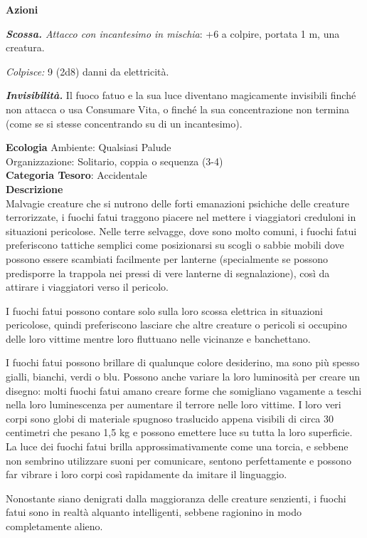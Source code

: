 \begin{multicols}{2}
{\textbf{Azioni}

\emph{\textbf{Scossa.} Attacco con incantesimo in mischia}: +6 a colpire, portata 1 m, una creatura.

\emph{Colpisce:} 9 (2d8) danni da elettricità.

\emph{\textbf{Invisibilità.}} Il fuoco fatuo e la sua luce diventano magicamente invisibili finché non attacca o usa Consumare Vita, o finché la sua concentrazione non termina (come se si stesse concentrando su di un incantesimo).

\textbf{Ecologia}
Ambiente: Qualsiasi Palude\\
Organizzazione: Solitario, coppia o sequenza (3-4)\\
\textbf{Categoria Tesoro}: Accidentale\\
\textbf{Descrizione}\\
Malvagie creature che si nutrono delle forti emanazioni psichiche delle creature terrorizzate, i fuochi fatui traggono piacere nel mettere i viaggiatori creduloni in situazioni pericolose. Nelle terre selvagge, dove sono molto comuni, i fuochi fatui preferiscono tattiche semplici come posizionarsi su scogli o sabbie mobili dove possono essere scambiati facilmente per lanterne (specialmente se possono predisporre la trappola nei pressi di vere lanterne di segnalazione), così da attirare i viaggiatori verso il pericolo.

I fuochi fatui possono contare solo sulla loro scossa elettrica in situazioni pericolose, quindi preferiscono lasciare che altre creature o pericoli si occupino delle loro vittime mentre loro fluttuano nelle vicinanze e banchettano.

I fuochi fatui possono brillare di qualunque colore desiderino, ma sono più spesso gialli, bianchi, verdi o blu. Possono anche variare la loro luminosità per creare un disegno: molti fuochi fatui amano creare forme che somigliano vagamente a teschi nella loro luminescenza per aumentare il terrore nelle loro vittime. I loro veri corpi sono globi di materiale spugnoso traslucido appena visibili di circa 30 centimetri che pesano 1,5 kg e possono emettere luce su tutta la loro superficie. La luce dei fuochi fatui brilla approssimativamente come una torcia, e sebbene non sembrino utilizzare suoni per comunicare, sentono perfettamente e possono far vibrare i loro corpi così rapidamente da imitare il linguaggio.

Nonostante siano denigrati dalla maggioranza delle creature senzienti, i fuochi fatui sono in realtà alquanto intelligenti, sebbene ragionino in modo completamente alieno.

}
\end{multicols}
